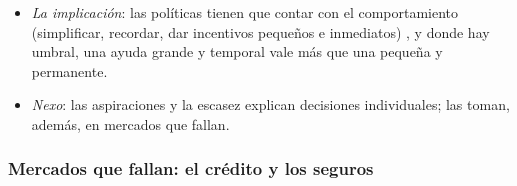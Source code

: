 \documentclass[11pt]{article}
\begin{document}
\begin{itemize}
  \begin{itemize}
  \item \emph{A favor}: en el programa de graduación de BRAC en Bangladés, que entregó activos (sobre todo vacas) a hogares muy pobres elegidos al azar, los que recibieron lo bastante para superar un umbral acumularon, cambiaron de ocupación y salieron de la pobreza durante 11~años; los que quedaron por debajo volvieron atrás\nocite{BalboniEtAl2022}.
  \item \emph{En contra, a escala de países}: casi todos los pobres crecen a largo plazo y los mecanismos son más continuos de lo que supone la teoría\nocite{KraayMcKenzie2014Do}. Las trampas existen para algunos hogares y lugares, pero no son la norma.
  \end{itemize}
\item \emph{La implicación}: las políticas tienen que contar con el comportamiento (simplificar, recordar, dar incentivos pequeños e inmediatos) , y donde hay umbral, una ayuda grande y temporal vale más que una pequeña y permanente.
\item \emph{Nexo}: las aspiraciones y la escasez explican decisiones individuales; las toman, además, en mercados que fallan.
\end{itemize}

\subsubsection{Mercados que fallan: el crédito y los seguros}\label{sec:mercados}
\end{document}
